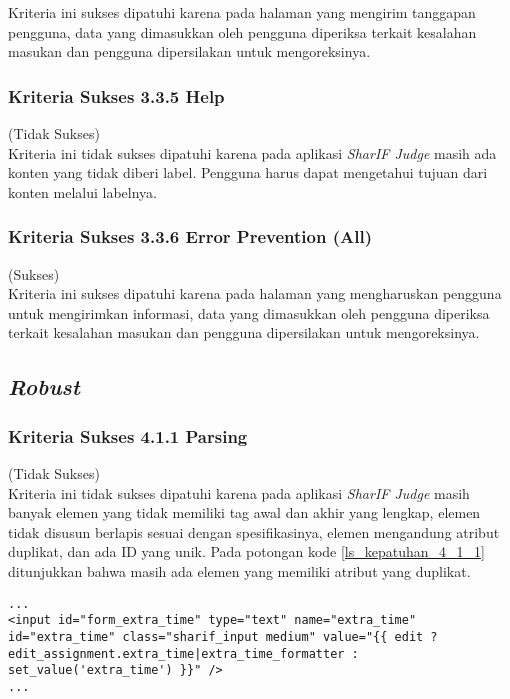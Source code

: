 Kriteria ini sukses dipatuhi karena pada halaman yang mengirim tanggapan pengguna, data yang dimasukkan oleh pengguna diperiksa terkait kesalahan masukan dan pengguna dipersilakan untuk mengoreksinya.

\subsubsection{Kriteria Sukses 3.3.5 Help}
\label{subsubsec:kepatuhan_kriteria_3.3.5}
(Tidak Sukses) \\

Kriteria ini tidak sukses dipatuhi karena
pada aplikasi \textit{SharIF Judge} masih ada konten yang tidak diberi label. Pengguna harus dapat mengetahui tujuan dari konten melalui labelnya.

\subsubsection{Kriteria Sukses 3.3.6 Error Prevention (All)}
\label{subsubsec:kepatuhan_kriteria_3.3.6}
(Sukses) \\

Kriteria ini sukses dipatuhi karena pada halaman yang mengharuskan pengguna untuk mengirimkan informasi, data yang dimasukkan oleh pengguna diperiksa terkait kesalahan masukan dan pengguna dipersilakan untuk mengoreksinya.

\subsection{\textit{Robust}}
\label{subsec:kepatuhan_robust}

\subsubsection{Kriteria Sukses 4.1.1 Parsing}
\label{subsubsec:kepatuhan_kriteria_4.1.1}
(Tidak Sukses)\\

Kriteria ini tidak sukses dipatuhi karena pada aplikasi \textit{SharIF Judge} masih banyak elemen yang tidak memiliki tag awal dan akhir yang lengkap, elemen tidak disusun berlapis sesuai dengan spesifikasinya, elemen mengandung atribut duplikat, dan ada ID yang unik. Pada potongan kode \ref{ls_kepatuhan_4_1_1} ditunjukkan bahwa masih ada elemen yang memiliki atribut yang duplikat.
\begin{lstlisting}[basicstyle=\ttfamily, frame=single,
columns=fullflexible, keepspaces=true, breaklines=true, label=ls_kepatuhan_4_1_1, caption=Kriteria Sukses 4.1.1 - Elemen Memiliki Atribut Duplikat]
...
<input id="form_extra_time" type="text" name="extra_time" id="extra_time" class="sharif_input medium" value="{{ edit ? edit_assignment.extra_time|extra_time_formatter : set_value('extra_time') }}" />
...
\end{lstlisting}

